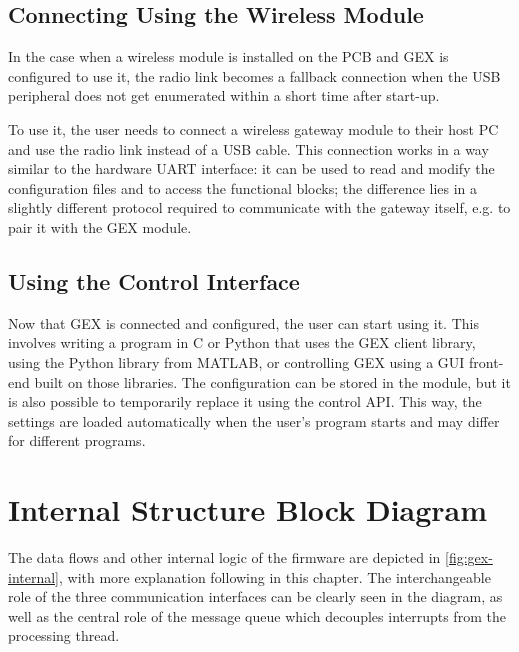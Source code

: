 \subsection{Connecting Using the Wireless Module}

In the case when a wireless module is installed on the \gls{PCB} and GEX is configured to use it, the radio link becomes a fallback connection when the \gls{USB} peripheral does not get enumerated within a short time after start-up.

To use it, the user needs to connect a wireless gateway module to their host \gls{PC} and use the radio link instead of a \gls{USB} cable. This connection works in a way similar to the hardware UART interface: it can be used to read and modify the configuration files and to access the functional blocks; the difference lies in a slightly different protocol required to communicate with the gateway itself, e.g. to pair it with the GEX module.

\subsection{Using the Control Interface}

Now that GEX is connected and configured, the user can start using it. This involves writing a program in C or Python that uses the GEX client library, using the Python library from MATLAB, or controlling GEX using a \gls{GUI} front-end built on those libraries. The configuration can be stored in the module, but it is also possible to temporarily replace it using the control \gls{API}. This way, the settings are loaded automatically when the user's program starts and may differ for different programs.

\section{Internal Structure Block Diagram}

The data flows and other internal logic of the firmware are depicted in \cref{fig:gex-internal}, with more explanation following in this chapter. The interchangeable role of the three communication interfaces can be clearly seen in the diagram, as well as the central role of the message queue which decouples interrupts from the processing thread.

